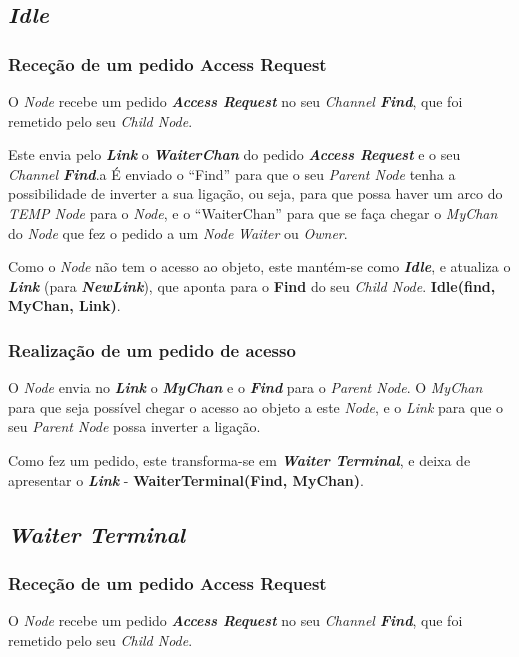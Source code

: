 \subsection*{\emph{Idle}}
\label{especificacao:nodes:idle}


\subsubsection*{Receção de um pedido Access Request}
O \emph{Node} recebe um pedido \emph{\textbf{Access Request}} no seu \emph{Channel \textbf{Find}}, que foi remetido pelo seu \emph{Child Node}.

Este envia pelo \textbf{\emph{Link}} o \textbf{\emph{WaiterChan}} do pedido \emph{\textbf{Access Request}} e o seu \emph{Channel \textbf{Find}}.a
É enviado o ``Find'' para que o seu \emph{Parent Node} tenha a possibilidade de inverter a sua ligação, ou seja, para que possa haver um arco do \emph{TEMP Node} para o \emph{Node}, 
e o ``WaiterChan'' para que se faça chegar o \emph{MyChan} do \emph{Node} que fez o pedido a um \emph{Node} \emph{Waiter} ou \emph{Owner}.

Como o \emph{Node} não tem o acesso ao objeto, este mantém-se como \emph{\textbf{Idle}}, e atualiza o \textbf{\emph{Link}} (para \textbf{\emph{NewLink}}), que aponta para o \textbf{Find} do seu \emph{Child Node}.
\textbf{Idle(find, MyChan, Link)}.



\subsubsection*{Realização de um pedido de acesso}
O \emph{Node} envia no \textbf{\emph{Link}} o \textbf{\emph{MyChan}} e o \textbf{\emph{Find}} para o \emph{Parent Node}.
O \emph{MyChan} para que seja possível chegar o acesso ao objeto a este \emph{Node}, e o \emph{Link} para que o seu \emph{Parent Node} possa inverter a ligação.

Como fez um pedido, este transforma-se em \emph{\textbf{Waiter Terminal}}, e deixa de apresentar o \textbf{\emph{Link}} - \textbf{WaiterTerminal(Find, MyChan)}.

\subsection*{\emph{Waiter Terminal}}
\label{especificacao:nodes:waiter_terminal}


\subsubsection*{Receção de um pedido Access Request}
O \emph{Node} recebe um pedido \emph{\textbf{Access Request}} no seu \emph{Channel \textbf{Find}}, que foi remetido pelo seu \emph{Child Node}.

